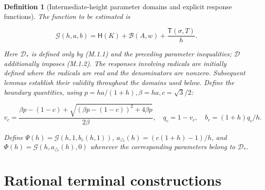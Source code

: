 \documentclass[11pt,a4paper]{article}
\theoremstyle{proofmanuscript}
\newtheorem{definition}[theorem]{Definition}
\begin{document}
\begin{definition}[Intermediate-height parameter domains and explicit response functions]
The function to be estimated is

\[
\mathcal G(h,a,b)=\mathsf H(K)+\mathcal B(A,w)
+\frac{\mathsf T(\sigma,T)}h.                              \tag{M.1.7}
\]

Here \(\mathcal D_*\) is defined only by (M.1.1) and the preceding parameter inequalities; \(\mathcal D\) additionally imposes (M.1.2). The responses involving radicals are initially defined where the radicals are real and the denominators are nonzero. Subsequent lemmas establish their validity throughout the domains used below. Define the boundary quantities, using \(p=ha/(1+h),\beta=ha,c=\sqrt3/2\):

\[
v_c=\frac{\beta p-(1-c)+\sqrt{(\beta p-(1-c))^2+4\beta p}}{2\beta},\quad q_c=1-v_c,\quad b_c=(1+h)q_c/h.
\]

Define \(\Psi(h)=\mathcal G(h,1,b_c(h,1))\), \(a_\triangle(h)=(c(1+h)-1)/h\), and \(\Phi(h)=\mathcal G(h,a_\triangle(h),0)\) whenever the corresponding parameters belong to \(\mathcal D_*\).

\end{definition}


\section{Rational terminal constructions}
\end{document}
